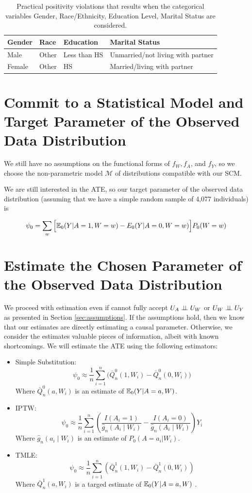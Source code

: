 \documentclass{article}
\begin{document}
\begin{table}
\begin{tabular}{| l | l | l | l |}
\hline
 Gender & Race & Education & Marital Status \\
\hline
Male & Other & Less than HS & Unmarried/not living with partner \\
Female & Other & HS & Married/living with partner \\
\hline
\end{tabular}
\caption{Practical positivity violations that results when the categorical variables Gender, Race/Ethnicity, Education Level, Marital Status are considered.}
\label{tab:proc.pos}
\end{table}

\section{Commit to a Statistical Model and Target Parameter of the Observed Data Distribution}

We still have no assumptions on the functional forms of $f_W, f_A$, and $f_Y$, so we choose the non-parametric model $\mathcal{M}$ of distributions compatible with our SCM.  

We are still interested in the ATE, so our target parameter of the observed data distribution (assuming that we have a simple random sample of 4,077 individuals) is

$$\psi_0 = \sum_{w}\Big[\mathbb{E}_0(Y|A=1,W=w)-E_0(Y|A=0,W=w)\Big]P_0(W=w)$$

\section{Estimate the Chosen Parameter of the Observed Data Distribution}
\label{sec:estimates}

We proceed with estimation even if cannot fully accept $U_A \perp\hspace{-5pt}\perp U_W$ or $U_W \perp\hspace{-5pt}\perp U_Y$ as presented in Section \ref{sec:assumptions}. If the assumptions hold, then we know that our estimates are directly estimating a causal parameter. Otherwise, we consider the estimates valuable pieces of information, albeit with known shortcomings. We will estimate the ATE using the following estimators: 

\begin{itemize}
  \item Simple Substitution:
    \[
      \psi_0 \approx \frac{1}{n}\sum_{i=1}^{n}\Big(\bar{Q}_{n}^{0}(1,W_i) - \bar{Q}_{n}^{0}(0,W_i)\Big)
    \]
Where $\bar{Q}_{n}^{0}(a,W_i)$ is an estimate of $\mathbb{E}_0(Y|A=a,W)$.
  \item IPTW:
  \[
    \psi_{0} \approx \frac{1}{n}\sum_{i=1}^{n} \left(\frac{I(A_i=1)}{\hat{g}_n(A_i \mid W_i)} - \frac{I(A_i=0)}{\hat{g}_n(A_i \mid W_i)} \right)Y_i
  \]
Where $\hat{g}_n(a_i \mid W_i)$ is an estimate of $P_0(A=a_i|W_i)$.
  \item TMLE:
  \[
    \psi_{0} \approx \frac{1}{n}\sum_{i=1}^{n}\left( \bar{Q}_{n}^{1}(1,W_i) - \bar{Q}_{n}^{1}(0,W_i)\right)
  \]
Where $\bar{Q}_{n}^{1}(a,W_i)$ is a targed estimate of $\mathbb{E}_0(Y|A=a,W)$ \cite{tmle}.
\end{itemize}
\end{document}
